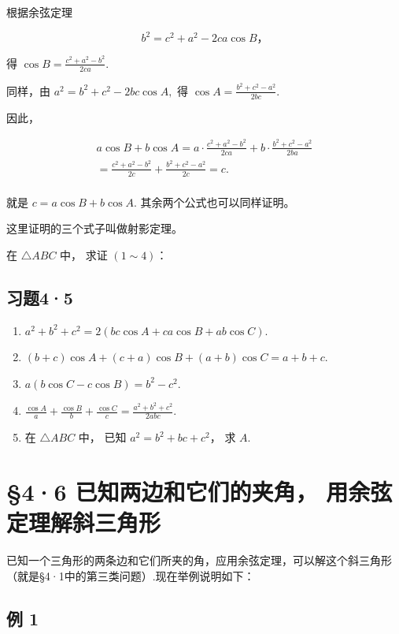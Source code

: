  根据余弦定理

\[
b ^ {2} = c ^ {2} + a ^ {2} - 2 c a \cos B\text{，}
\]

得 \(\cos B = \frac{c^2 + a^2 - b^2}{2ca}\).

同样，由 \(a^2 = b^2 + c^2 - 2bc\cos A,\) 得
\(\cos A = \frac{b^2 + c^2 - a^2}{2bc}\).

因此，

\[
\begin{array}{l} a \cos B + b \cos A = a \cdot \frac {c ^ {2} + a ^ {2} - b ^ {2}}{2 c a} + b \cdot \frac {b ^ {2} + c ^ {2} - a ^ {2}}{2 b a} \\ = \frac {c ^ {2} + a ^ {2} - b ^ {2}}{2 c} + \frac {b ^ {2} + c ^ {2} - a ^ {2}}{2 c} = c. \\ \end{array}
\]

就是 \(c = a\cos B + b\cos A.\) 其余两个公式也可以同样证明。

这里证明的三个式子叫做射影定理。

在 \(\triangle ABC\) 中， 求证 \((1 \sim 4)\)：

\subsection{习题4·5}

\begin{enumerate}
\item
  \(a^2 + b^2 + c^2 = 2(bc \cos A + ca \cos B + ab \cos C)\).
\item
  \((b + c)\cos A + (c + a)\cos B + (a + b)\cos C = a + b + c.\)
\item
  \(a(b\cos C - c\cos B) = b^2 - c^2.\)
\item
  \(\frac{\cos A}{a} + \frac{\cos B}{b} + \frac{\cos C}{c} = \frac{a^2 + b^2 + c^2}{2abc}\).
\item
  在 \(\triangle ABC\) 中， 已知 \(a^2 = b^2 + bc + c^2\)， 求 \(A\).
\end{enumerate}

\section{§4·6 已知两边和它们的夹角， 用余弦定理解斜三角形}

已知一个三角形的两条边和它们所夹的角，应用余弦定理，可以解这个斜三角形（就是§4·1中的第三类问题）.现在举例说明如下：

\subsection{例 1}

